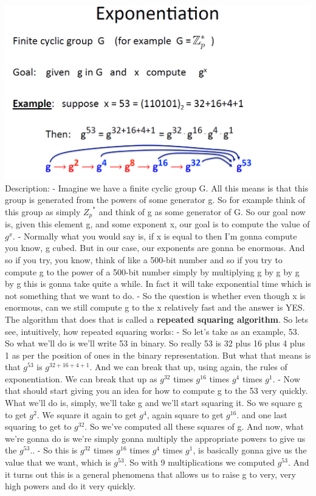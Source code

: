 \documentclass[11pt]{article}
\makeatletter
\def\maxwidth{\ifdim\Gin@nat@width>\linewidth\linewidth
    \else\Gin@nat@width\fi}
\let\Oldincludegraphics\includegraphics
\renewcommand{\includegraphics}[1]{\Oldincludegraphics[width=.8\maxwidth]{#1}}
\makeatother
\begin{document}
\includegraphics{./Images/NT-Exponentiation.png} Description: - Imagine
we have a finite cyclic group G. All this means is that this group is
generated from the powers of some generator g. So for example think of
this group as simply \({Z_{p}}^{*}\) and think of g as some generator of
G. So our goal now is, given this element g, and some exponent x, our
goal is to compute the value of \(g^{x}\). - Normally what you would say
is, if x is equal to then I'm gonna compute you know, g cubed. But in
our case, our exponents are gonna be enormous. And so if you try, you
know, think of like a 500-bit number and so if you try to compute g to
the power of a 500-bit number simply by multiplying g by g by g by g
this is gonna take quite a while. In fact it will take exponential time
which is not something that we want to do. - So the question is whether
even though x is enormous, can we still compute g to the x relatively
fast and the answer is YES. The algorithm that does that is called a
\textbf{repeated squaring algorithm}. So lets see, intuitively, how
repeated squaring works: - So let's take as an example, 53. So what
we'll do is we'll write 53 in binary. So really 53 is 32 plus 16 plus 4
plus 1 as per the position of ones in the binary representation. But
what that means is that \(g^{53}\) is \(g^{32+16+4+1}\). And we can
break that up, using again, the rules of exponentiation. We can break
that up as \(g^{32}\) times \(g^{16}\) times \(g^{4}\) times \(g^{1}\).
- Now that should start giving you an idea for how to compute g to the
53 very quickly. What we'll do is, simply, we'll take g and we'll start
squaring it. So we square g to get \(g^{2}\). We square it again to get
\(g^{4}\), again square to get \(g^{16}\). and one last squaring to get
to \(g^{32}\). So we've computed all these squares of g. And now, what
we're gonna do is we're simply gonna multiply the appropriate powers to
give us the \(g^{53}\).. - So this is \(g^{32}\) times \(g^{16}\) times
\(g^{4}\) times \(g^{1}\), is basically gonna give us the value that we
want, which is \(g^{53}\). So with 9 multiplications we computed
\(g^{53}\). And it turns out this is a general phenomena that allows us
to raise g to very, very high powers and do it very quickly.
\end{document}
